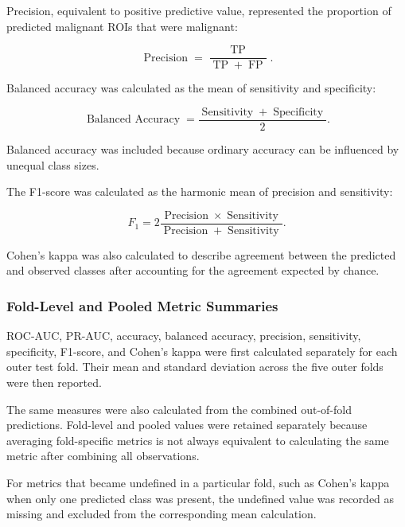 \documentclass[12pt,twocolumn]{article}
\begin{document}
Precision, equivalent to positive predictive value, represented the
proportion of predicted malignant ROIs that were malignant:

\begin{equation}
\operatorname{Precision}
=
\frac{\operatorname{TP}}
{\operatorname{TP}+\operatorname{FP}}.
\label{eq:precision}
\end{equation}

Balanced accuracy was calculated as the mean of sensitivity and
specificity:

\begin{equation}
\operatorname{Balanced\ Accuracy}
=
\frac{
\operatorname{Sensitivity}
+
\operatorname{Specificity}
}{2}.
\label{eq:balanced_accuracy}
\end{equation}

Balanced accuracy was included because ordinary accuracy can be
influenced by unequal class sizes.

The F1-score was calculated as the harmonic mean of precision and
sensitivity:

\begin{equation}
F_1
=
2
\frac{
\operatorname{Precision}
\times
\operatorname{Sensitivity}
}{
\operatorname{Precision}
+
\operatorname{Sensitivity}
}.
\label{eq:f1_score}
\end{equation}

Cohen's kappa was also calculated to describe agreement between the
predicted and observed classes after accounting for the agreement
expected by chance.






\subsubsection{Fold-Level and Pooled Metric Summaries}
\label{subsubsec:fold_pooled_metrics}

ROC-AUC, PR-AUC, accuracy, balanced accuracy, precision, sensitivity,
specificity, F1-score, and Cohen's kappa were first calculated
separately for each outer test fold. Their mean and standard deviation
across the five outer folds were then reported.

The same measures were also calculated from the combined out-of-fold
predictions. Fold-level and pooled values were retained separately
because averaging fold-specific metrics is not always equivalent to
calculating the same metric after combining all observations.

For metrics that became undefined in a particular fold, such as
Cohen's kappa when only one predicted class was present, the undefined
value was recorded as missing and excluded from the corresponding
mean calculation.
\end{document}
